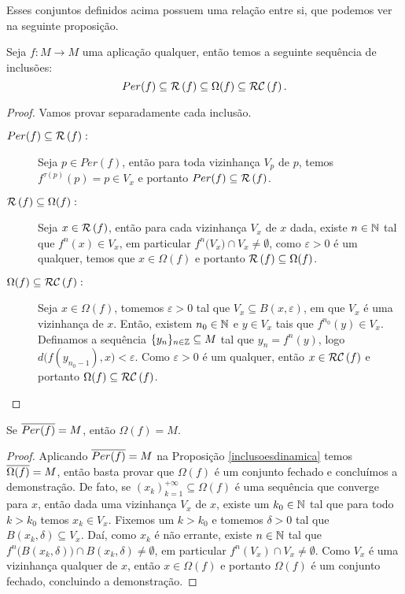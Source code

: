 Esses conjuntos definidos acima possuem uma relação entre si, que podemos ver na seguinte proposição.

\begin{proposicao}\label{inclusoesdinamica} Seja $f:M\to M$ uma aplicação qualquer, então temos a seguinte sequência de inclusões: $${Per(f)}\subseteq\mathcal{R}\left(f\right)\subseteq\Omega(f)\subseteq\mathcal{RC}\left(f\right).$$
\end{proposicao}

\begin{proof} Vamos provar separadamente cada inclusão.
\begin{description}
\item[${Per(f)}\subseteq\mathcal{R}\left(f\right):$] Seja $p\in{Per(f)}$, então para toda vizinhança $V_p$ de $p$, temos $f^{\tau(p)}(p)=p\in V_x$ e portanto $Per(f)\subseteq\mathcal{R}\left(f\right)$.

\item[$\mathcal{R}\left(f\right)\subseteq\Omega(f):$] Seja $x\in\mathcal{R}\left(f\right)$, então para cada vizinhança $V_x$ de $x$ dada, existe $n\in\mathbb{N}$ tal que $f^n(x)\in V_x$, em particular $f^n\big(V_x\big)\cap V_x\neq\emptyset$, como $\varepsilon>0$ é um qualquer, temos que $x\in\Omega(f)$ e portanto $\mathcal{R}\left(f\right)\subseteq\Omega(f)$.

\item[$\Omega(f)\subseteq\mathcal{RC}\left(f\right):$] Seja $x\in\Omega(f)$, tomemos $\varepsilon>0$ tal que $V_x\subseteq B(x,\varepsilon)$, em que $V_x$ é uma vizinhança de $x$. Então, existem $n_0\in\mathbb{N}$ e $y\in V_x$ tais que $f^{n_0}(y)\in V_x$. Definamos a sequência $\{y_n\}_{n\in\mathbb{Z}}\subseteq M$ tal que $y_n=f^n(y)$, logo $d\big(f(y_{n_0-1}),x\big)<\varepsilon$. Como $\varepsilon>0$ é um qualquer, então $x\in \mathcal{RC}\left(f\right)$ e portanto $\Omega(f)\subseteq\mathcal{RC}\left(f\right)$.
\end{description}
\end{proof}

\begin{corolario} Se $\overline{Per(f)}=M$, então $\Omega(f)=M$.
\end{corolario}

\begin{proof} Aplicando $\overline{Per(f)}=M$ na Proposição \ref{inclusoesdinamica} temos $\overline{\Omega(f)}= M$, então basta provar que ${\Omega(f)}$ é um conjunto fechado e concluímos a demonstração. De fato, se $(x_k)_{k=1}^{+\infty}\subseteq\Omega(f)$ é uma sequência que converge para $x$, então dada uma vizinhança $V_x$ de $x$, existe um $k_0\in\mathbb{N}$ tal que para todo $k>k_0$ temos $x_k\in V_x$. Fixemos um $k>k_0$ e tomemos $\delta>0$ tal que $B(x_k,\delta)\subseteq V_x$. Daí, como $x_k$ é não errante, existe $n\in\mathbb{N}$ tal que $f^n\big(B(x_k,\delta)\big)\cap B(x_k,\delta)\neq\emptyset$, em particular $f^n(V_x)\cap V_x\neq\emptyset$. Como $V_x$ é uma vizinhança qualquer de $x$, então $x\in\Omega(f)$ e portanto $\Omega(f)$ é um conjunto fechado, concluindo a demonstração.
\end{proof}

